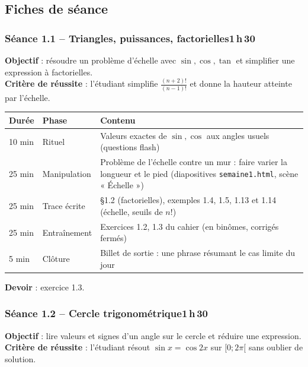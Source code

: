 \documentclass[10.5pt,a4paper]{article}
\newif\ifprof
\newcommand{\profonly}[1]{\ifprof #1\fi}
\begin{document}
\subsection{Fiches de séance}
\subsubsection*{\textcolor{marine}{Séance 1.1 -- Triangles, puissances, factorielles}\hfill\normalfont\small\textcolor{ardoise}{1\,h\,30}}
\begin{objectif}\textbf{Objectif} : résoudre un problème d'échelle avec $\sin,\cos,\tan$ et simplifier une expression à factorielles.\\\textbf{Critère de réussite} : l'étudiant simplifie $\frac{(n+2)!}{(n-1)!}$ et donne la hauteur atteinte par l'échelle.\end{objectif}\nopagebreak
\begin{longtable}{@{}p{1.1cm}p{2.4cm}p{12.4cm}@{}}
\toprule \textbf{Durée} & \textbf{Phase} & \textbf{Contenu}\\ \midrule\endhead
10 min & Rituel & Valeurs exactes de $\sin,\cos$ aux angles usuels (questions flash)\\
25 min & Manipulation & Problème de l'échelle contre un mur : faire varier la longueur et le pied (diapositives \texttt{semaine1.html}, scène « Échelle »)\\
25 min & Trace écrite & \S1.2 (factorielles), exemples 1.4, 1.5, 1.13 et 1.14 (échelle, seuils de $n!$)\\
25 min & Entraînement & Exercices 1.2, 1.3 du cahier (en binômes, corrigés fermés)\\
5 min & Clôture & Billet de sortie : une phrase résumant le cas limite du jour\\ \bottomrule\end{longtable}\nopagebreak
\textbf{Devoir} : exercice 1.3.\profonly{ \textbf{Point de vigilance} : Distinguer $\frac{(n+2)!}{(n-1)!}$ de $(n+2)!/(n-1)$ : insister sur la factorisation du plus petit factoriel.}\par
{}\subsubsection*{\textcolor{marine}{Séance 1.2 -- Cercle trigonométrique}\hfill\normalfont\small\textcolor{ardoise}{1\,h\,30}}
\begin{objectif}\textbf{Objectif} : lire valeurs et signes d'un angle sur le cercle et réduire une expression.\\\textbf{Critère de réussite} : l'étudiant résout $\sin x=\cos2x$ sur $[0;2\pi[$ sans oublier de solution.\end{objectif}\nopagebreak
\end{document}
